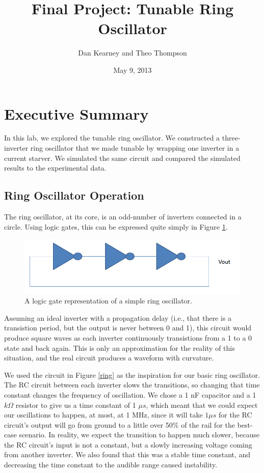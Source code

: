 \documentclass{article}
\title{Final Project: Tunable Ring Oscillator}
\author{Dan Kearney and Theo Thompson}
\date{May 9, 2013}
\begin{document}
\maketitle

\section*{Executive Summary}

In this lab, we explored the tunable ring oscillator.  We constructed a three-inverter ring oscillator that we made tunable by wrapping one inverter in a current starver.  We simulated the same circuit and compared the simulated results to the experimental data.

\subsection*{Ring Oscillator Operation}

The ring oscillator, at its core, is an odd-number of inverters connected in a circle.  Using logic gates, this can be expressed quite simply in Figure \ref{simpleSchem}.

\begin{figure}[H]
\centering
\includegraphics[scale=.4]{simpleSchem.png}
\caption{A logic gate representation of a simple ring oscillator.}
\label{simpleSchem}
\end{figure}

Assuming an ideal inverter with a propagation delay (i.e., that there is a transistion period, but the output is never between 0 and 1), this circuit would produce square waves as each inverter continuously transistions from a 1 to a 0 state and back again.  This is only an approximation for the reality of this situation, and the real circuit produces a waveform with curvature.

We used the circuit in Figure \ref{ring} as the inspiration for our basic ring oscillator.  The RC circuit between each inverter slows the transitions, so changing that time constant changes the frequency of oscillation.  We chose a 1 nF capacitor and a 1 $k\Omega$ resistor to give us a time constant of 1 $\mu s$, which meant that we could expect our oscillations to happen, at most, at 1 MHz, since it will take $1 \mu s$ for the RC circuit's output will go from ground to a little over 50\% of the rail for the best-case scenario.  In reality, we expect the transition to happen much slower, because the RC circuit's input is not a constant, but a slowly increasing voltage coming from another inverter.  We also found that this was a stable time constant, and decreasing the time constant to the audible range caused instability.
\end{document}
